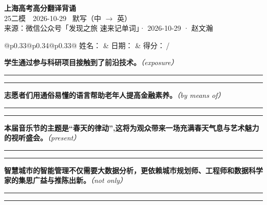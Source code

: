 \documentclass[11pt,a4paper]{article}
\newcommand{\num}[1]{\makebox[1.9em][r]{#1.}\hspace{0.3em}}
\newcommand{\wline}{\noindent\rule{\linewidth}{0.4pt}}
\newcommand{\prompt}[1]{\emph{\textcolor{tipblue}{\small（#1）}}}
\begin{document}
\pagestyle{plain}
\begin{center}
{\LARGE\bfseries 上海高考高分翻译背诵 }\\[0.25em]
{\large 25二模　2026-10-29 \quad\ 默写（中 $\to$ 英）}\\[0.35em]
{\footnotesize 来源：微信公众号「发现之旅 速来记单词」· 2026-10-29 · 赵文瀚}
\end{center}

\vspace{0.4em}
\noindent\begin{tabular}{@{}p{0.33\textwidth}@{}p{0.34\textwidth}@{}p{0.33\textwidth}@{}}
姓名：\underline{\hspace{2.0cm}} & 日期：\underline{\hspace{2.0cm}} & 得分：\underline{\hspace{1.4cm}}\,/ \\
\end{tabular}

\vspace{0.5em}

\vspace{0.8em}
\num{1}\textbf{学生通过参与科研项目接触到了前沿技术。}\prompt{exposure}

\vspace{0.3em}

\wline\vspace{0.3em}
\wline

\num{2}\textbf{志愿者们用通俗易懂的语言帮助老年人提高金融素养。}\prompt{by means of}

\vspace{0.3em}

\wline\vspace{0.3em}
\wline

\num{3}\textbf{本届音乐节的主题是“春天的律动”,这将为观众带来一场充满春天气息与艺术魅力的视听盛会。}\prompt{present}

\vspace{0.3em}

\wline\vspace{0.3em}
\wline

\num{4}\textbf{智慧城市的智能管理不仅需要大数据分析，更依赖城市规划师、工程师和数据科学家的集思广益与推陈出新。}\prompt{not only}

\vspace{0.3em}

\wline\vspace{0.3em}
\wline
\end{document}
